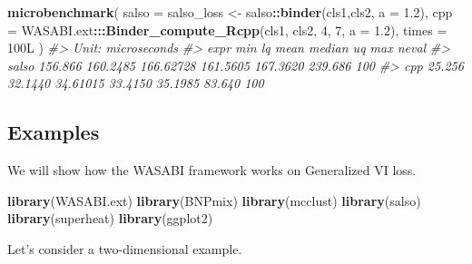 \documentclass[
]{article}
\newenvironment{Shaded}{\begin{snugshade}}{\end{snugshade}}
\newcommand{\AttributeTok}[1]{\textcolor[rgb]{0.13,0.29,0.53}{#1}}
\newcommand{\CommentTok}[1]{\textcolor[rgb]{0.56,0.35,0.01}{\textit{#1}}}
\newcommand{\DataTypeTok}[1]{\textcolor[rgb]{0.13,0.29,0.53}{#1}}
\newcommand{\DecValTok}[1]{\textcolor[rgb]{0.00,0.00,0.81}{#1}}
\newcommand{\FloatTok}[1]{\textcolor[rgb]{0.00,0.00,0.81}{#1}}
\newcommand{\FunctionTok}[1]{\textcolor[rgb]{0.13,0.29,0.53}{\textbf{#1}}}
\newcommand{\NormalTok}[1]{#1}
\newcommand{\OtherTok}[1]{\textcolor[rgb]{0.56,0.35,0.01}{#1}}
\newcommand{\SpecialCharTok}[1]{\textcolor[rgb]{0.81,0.36,0.00}{\textbf{#1}}}
\begin{document}
\begin{Shaded}
\begin{Highlighting}[]
\FunctionTok{microbenchmark}\NormalTok{(}
  \AttributeTok{salso =}\NormalTok{ salso\_loss }\OtherTok{\textless{}{-}}\NormalTok{ salso}\SpecialCharTok{::}\FunctionTok{binder}\NormalTok{(cls1,cls2, }\AttributeTok{a =} \FloatTok{1.2}\NormalTok{),}
  \AttributeTok{cpp =}\NormalTok{ WASABI.ext}\SpecialCharTok{:::}\FunctionTok{Binder\_compute\_Rcpp}\NormalTok{(cls1, cls2, }\DecValTok{4}\NormalTok{, }\DecValTok{7}\NormalTok{, }\AttributeTok{a =} \FloatTok{1.2}\NormalTok{),}
  \AttributeTok{times =} \DecValTok{100}\DataTypeTok{L}
\NormalTok{)}
\CommentTok{\#\textgreater{} Unit: microseconds}
\CommentTok{\#\textgreater{}   expr     min       lq      mean   median       uq     max neval}
\CommentTok{\#\textgreater{}  salso 156.866 160.2485 166.62728 161.5605 167.3620 239.686   100}
\CommentTok{\#\textgreater{}    cpp  25.256  32.1440  34.61015  33.4150  35.1985  83.640   100}
\end{Highlighting}
\end{Shaded}

\subsection{Examples}\label{examples}

We will show how the WASABI framework works on Generalized VI loss.

\begin{Shaded}
\begin{Highlighting}[]
\FunctionTok{library}\NormalTok{(WASABI.ext)}
\FunctionTok{library}\NormalTok{(BNPmix)}
\FunctionTok{library}\NormalTok{(mcclust)}
\FunctionTok{library}\NormalTok{(salso)}
\FunctionTok{library}\NormalTok{(superheat)}
\FunctionTok{library}\NormalTok{(ggplot2)}
\end{Highlighting}
\end{Shaded}

Let's consider a two-dimensional example.
\end{document}

